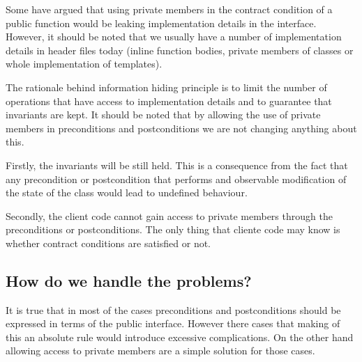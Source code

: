 Some have argued that using private members in the contract condition of a
public function would be leaking implementation details in the interface.
However, it should be noted that we usually have a number of implementation
details in header files today (inline function bodies, private members of
classes or whole implementation of templates).

The rationale behind information hiding principle is to limit the number of
operations that have access to implementation details and to guarantee that
invariants are kept. It should be noted that by allowing the use of private
members in preconditions and postconditions we are not changing anything about
this.

Firstly, the invariants will be still held. This is a consequence from the fact
that any precondition or postcondition that performs and observable modification
of the state of the class would lead to undefined behaviour.

Secondly, the client code cannot gain access to private members through the
preconditions or postconditions. The only thing that cliente code may know is
whether contract conditions are satisfied or not.

\subsection{How do we handle the problems?}

It is true that in most of the cases preconditions and postconditions should be
expressed in terms of the public interface. However there cases that making of
this an absolute rule would introduce excessive complications. On the other hand
allowing access to private members are a simple solution for those cases.



